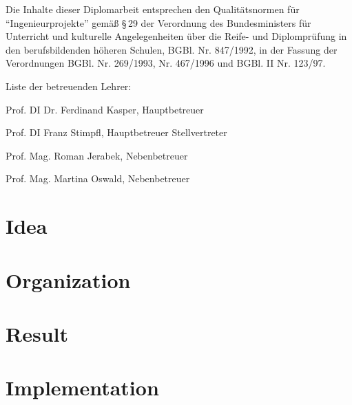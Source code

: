 \documentclass[12pt,a4paper,english,oneside,openright,DIV=12,BCOR=1cm]{scrbook}
\begin{document}

\thispagestyle{fancy}

Die Inhalte dieser Diplomarbeit entsprechen den Qualitätsnormen für
``Ingenieurprojekte'' gemäß §\,29 der Verordnung des Bundesministers
für Unterricht und kulturelle Angelegenheiten über die Reife- und
Diplomprüfung in den berufsbildenden höheren Schulen, BGBl. Nr. 847/1992,
in der Fassung der Verordnungen BGBl. Nr. 269/1993, Nr. 467/1996 und
BGBl. II Nr. 123/97.

\vspace{10mm}


Liste der betreuenden Lehrer:

Prof. DI Dr. Ferdinand Kasper, Hauptbetreuer

Prof. DI Franz Stimpfl, Hauptbetreuer Stellvertreter

Prof. Mag. Roman Jerabek, Nebenbetreuer

Prof. Mag. Martina Oswald, Nebenbetreuer %

\vspace{10mm}

\renewcommand*{\chapterpagestyle}{fancy}
\cleardoublepage{}
\tableofcontents{}
\cleardoublepage{}
\listoftables
\cleardoublepage{}
\listoffigures
\cleardoublepage{}
\listoflistings

\cleardoublepage{}

\pagestyle{fancy}
\thispagestyle{fancy}

\newcommand{\tfpath}[1]{\textbf{#1}}
\newcommand{\tfcode}[1]{\texttt{\detokenize{#1}}}

\chapter{Idea}


\chapter{Organization}


\chapter{Result}


\chapter{Implementation}

\end{document}
